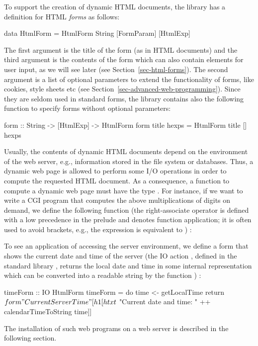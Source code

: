 To support the creation of dynamic HTML documents,
the library 
has a definition for HTML \emph{forms}
as follows:
\begin{curry}
data HtmlForm = HtmlForm String [FormParam] [HtmlExp]
\end{curry}
The first argument is the title of the form (as in HTML documents)
and the third argument is the contents of the form
which can also contain elements for user input, as
we will see later (see Section~\ref{sec-html-forms}).
The second argument is a list of optional parameters
to extend the functionality of forms, like cookies,
style sheets etc (see Section~\ref{sec-advanced-web-programming}).
Since they are seldom used in standard forms,
the  library contains also the following function
to specify forms without optional parameters:
\begin{curry}
form :: String -> [HtmlExp] -> HtmlForm
form title hexps = HtmlForm title [] hexps
\end{curry}
%
Usually, the contents of dynamic HTML documents depend on the
environment of the web server, e.g., information stored in the
file system or databases. Thus, a dynamic web page is allowed to
perform some I/O operations in order to compute the requested
HTML document. As a consequence, a function to compute
a dynamic web page must have
the type . For instance, if we want to
write a CGI program that computes the above multiplications
of digits on demand, we define the following function 
(the right-associate operator \ccode{\$}\pindex{\$} is
defined with a low precedence
in the prelude and denotes function application; it is often used to avoid
brackets, e.g., the expression  is equivalent to
)
:
To see an application of accessing the server environment,
we define a form that shows the current date and time of the server
(the IO action ,
defined in the standard library , returns the local
date and time in some internal representation which can be
converted into a readable string by the function
)
:
\begin{curry}
timeForm :: IO HtmlForm
timeForm = do
 time <- getLocalTime
 return $ form "Current Server Time"
          [h1 [htxt $ "Current date and time: " ++ calendarTimeToString time]]
\end{curry}
%
The installation of such web programs on a web server is described
in the following section.

